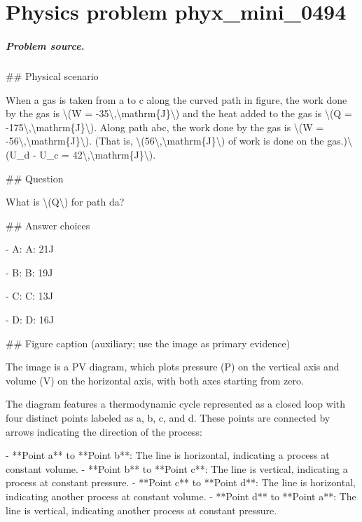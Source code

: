 
\chapter{Physics problem phyx\_mini\_0494}
\label{ch:PhyXMiniProblems_problem_phyx_mini_0494}

\paragraph{Problem source.}
\#\# Physical scenario

When a gas is taken from a to c along the curved path in figure, the work done by the gas is \textbackslash{}(W = -35\textbackslash{},\textbackslash{}mathrm\{J\}\textbackslash{}) and the heat added to the gas is \textbackslash{}(Q = -175\textbackslash{},\textbackslash{}mathrm\{J\}\textbackslash{}). Along path abc, the work done by the gas is \textbackslash{}(W = -56\textbackslash{},\textbackslash{}mathrm\{J\}\textbackslash{}). (That is, \textbackslash{}(56\textbackslash{},\textbackslash{}mathrm\{J\}\textbackslash{}) of work is done on the gas.)\textbackslash{}(U\_d - U\_c = 42\textbackslash{},\textbackslash{}mathrm\{J\}\textbackslash{}).

\#\# Question

What is \textbackslash{}(Q\textbackslash{}) for path da?

\#\# Answer choices

- A: A: 21J

- B: B: 19J

- C: C: 13J

- D: D: 16J

\#\# Figure caption (auxiliary; use the image as primary evidence)

The image is a PV diagram, which plots pressure (P) on the vertical axis and volume (V) on the horizontal axis, with both axes starting from zero. 

The diagram features a thermodynamic cycle represented as a closed loop with four distinct points labeled as a, b, c, and d. These points are connected by arrows indicating the direction of the process:

- **Point a** to **Point b**: The line is horizontal, indicating a process at constant volume.
- **Point b** to **Point c**: The line is vertical, indicating a process at constant pressure.
- **Point c** to **Point d**: The line is horizontal, indicating another process at constant volume.
- **Point d** to **Point a**: The line is vertical, indicating another process at constant pressure.

